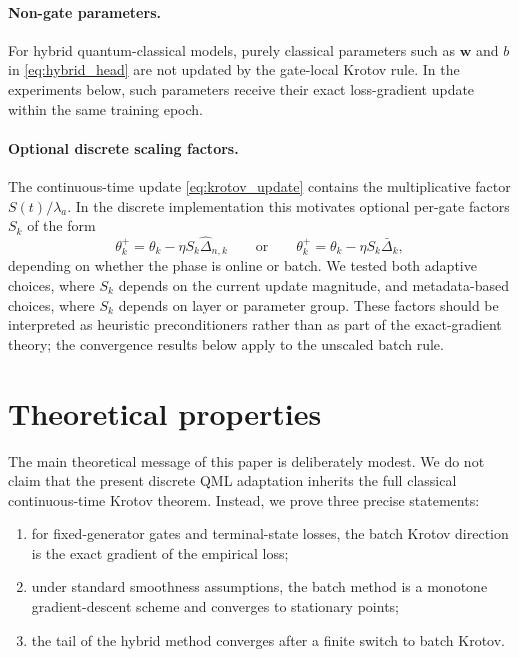 \documentclass[aps,prb,10pt,twocolumn,superscriptaddress]{revtex4-2}
\begin{document}
\paragraph{Non-gate parameters.}
For hybrid quantum-classical models, purely classical parameters such as \(\bm{w}\) and \(b\) in \eqref{eq:hybrid_head} are not updated by the gate-local Krotov rule. In the experiments below, such parameters receive their exact loss-gradient update within the same training epoch.

\paragraph{Optional discrete scaling factors.}
The continuous-time update \eqref{eq:krotov_update} contains the multiplicative factor \(S(t)/\lambda_a\). In the discrete implementation this motivates optional per-gate factors \(S_k\) of the form
\begin{equation}
\theta_k^{+}
=
\theta_k-\eta S_k \widehat{\Delta}_{n,k}
\qquad\text{or}\qquad
\theta_k^{+}
=
\theta_k-\eta S_k \bar{\Delta}_k,
\label{eq:discrete_scaling}
\end{equation}
depending on whether the phase is online or batch. We tested both adaptive choices, where \(S_k\) depends on the current update magnitude, and metadata-based choices, where \(S_k\) depends on layer or parameter group. These factors should be interpreted as heuristic preconditioners rather than as part of the exact-gradient theory; the convergence results below apply to the unscaled batch rule.

\section{Theoretical properties}

The main theoretical message of this paper is deliberately modest. We do not claim that the present discrete QML adaptation inherits the full classical continuous-time Krotov theorem. Instead, we prove three precise statements:
\begin{enumerate}
    \item for fixed-generator gates and terminal-state losses, the batch Krotov direction is the exact gradient of the empirical loss;
    \item under standard smoothness assumptions, the batch method is a monotone gradient-descent scheme and converges to stationary points;
    \item the tail of the hybrid method converges after a finite switch to batch Krotov.
\end{enumerate}
\end{document}
